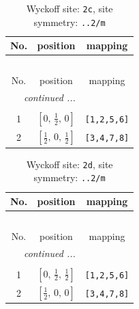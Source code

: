 \documentclass[fleqn,8pt]{jsarticle}
\begin{document}
\renewcommand{\arraystretch}{1.2}
\begin{longtable}{ccc}
\caption{Wyckoff site: {\tt 2c}, site symmetry: {\tt ..2/m}}
 \\
 \hline \hline
No. & position & mapping \\ \hline \endfirsthead

\multicolumn{2}{l}{\tablename\ \thetable{}} \\
 \hline \hline
No. & position & mapping \\ \hline \endhead

 \hline \hline
\multicolumn{2}{r}{\footnotesize\it continued ...} \\ \endfoot

 \hline \hline
\multicolumn{2}{r}{} \\ \endlastfoot

1 & $\left[ 0,\, \frac{1}{2},\, 0 \right]$ & {\tt [1,2,5,6]} \\ \hline
2 & $\left[ \frac{1}{2},\, 0,\, \frac{1}{2} \right]$ & {\tt [3,4,7,8]} \\
\end{longtable}
\renewcommand{\arraystretch}{1.2}
\begin{longtable}{ccc}
\caption{Wyckoff site: {\tt 2d}, site symmetry: {\tt ..2/m}}
 \\
 \hline \hline
No. & position & mapping \\ \hline \endfirsthead

\multicolumn{2}{l}{\tablename\ \thetable{}} \\
 \hline \hline
No. & position & mapping \\ \hline \endhead

 \hline \hline
\multicolumn{2}{r}{\footnotesize\it continued ...} \\ \endfoot

 \hline \hline
\multicolumn{2}{r}{} \\ \endlastfoot

1 & $\left[ 0,\, \frac{1}{2},\, \frac{1}{2} \right]$ & {\tt [1,2,5,6]} \\ \hline
2 & $\left[ \frac{1}{2},\, 0,\, 0 \right]$ & {\tt [3,4,7,8]} \\
\end{longtable}
\renewcommand{\arraystretch}{1.2}
\end{document}
